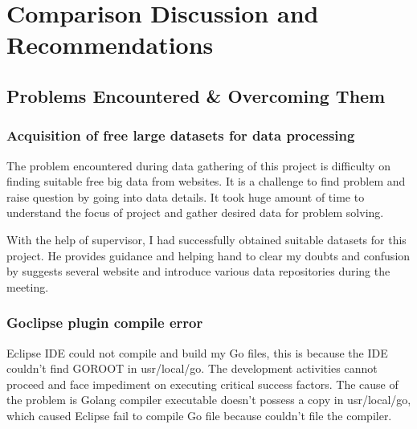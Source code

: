 \chapter{Comparison Discussion and Recommendations} 

\label{Chapter7} 


\doublespacing



\section{Problems Encountered \& Overcoming Them}

\subsection{Acquisition of free large datasets for data processing}

The problem encountered during data gathering of this project is difficulty on finding suitable free big data from websites. It is a challenge to find problem and raise question by going into data details. It took huge amount of time to understand the focus of project and gather desired data for problem solving. 

With the help of supervisor, I had successfully obtained suitable datasets for this project. He provides guidance and helping hand to clear my doubts and confusion by suggests several website and introduce various data repositories during the meeting. 

\subsection{Goclipse plugin compile error}

Eclipse IDE could not compile and build my Go files, this is because the IDE couldn’t find GOROOT in usr/local/go. The development activities cannot proceed and face impediment on executing critical success factors. The cause of the problem is Golang compiler executable doesn't possess a copy in usr/local/go, which caused Eclipse fail to compile Go file because couldn't file the compiler. 

